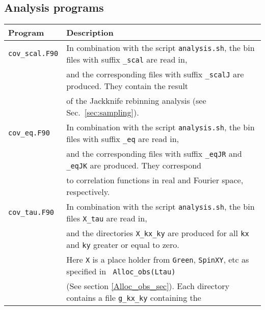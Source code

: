
\subsection{ Analysis programs }\label{sec:analysis}
%
\begin{table}[h]
  \begin{tabular}{@{} l l @{}}\toprule
   Program & Description \\\midrule
   \texttt{cov\_scal.F90}  &  In combination with the script \texttt{analysis.sh}, the bin files with suffix \texttt{\_scal} are read in, \\
                           & and  the corresponding files with suffix \texttt{\_scalJ} are produced. They  contain the  result \\
                           & of the Jackknife rebinning analysis  (see Sec.~\ref{sec:sampling}).  \\
   \texttt{cov\_eq.F90}    &  In combination with the script \texttt{analysis.sh}, the bin files with suffix \texttt{\_eq} are read in, \\
                           & and the corresponding files with suffix  \texttt{\_eqJR}  and  \texttt{\_eqJK}  are produced. They  correspond \\
                           & to correlation functions in real and Fourier space, respectively.  \\
   \texttt{cov\_tau.F90}   &  In combination with the script \texttt{analysis.sh}, the bin files  \texttt{X\_tau} are read in, \\
                           & and the directories  \texttt{X\_kx\_ky} are produced  for all \texttt{kx} and \texttt{ky} greater or equal to zero. \\
                           & Here \texttt{X}  is a place holder from \texttt{Green}, \texttt{SpinXY}, etc   as specified in \texttt{ Alloc\_obs(Ltau)} \\
                           & (See section \ref{Alloc_obs_sec}). Each directory contains  a  file    \texttt{g\_kx\_ky}  containing the  \\

\end{tabular}
\end{table}
